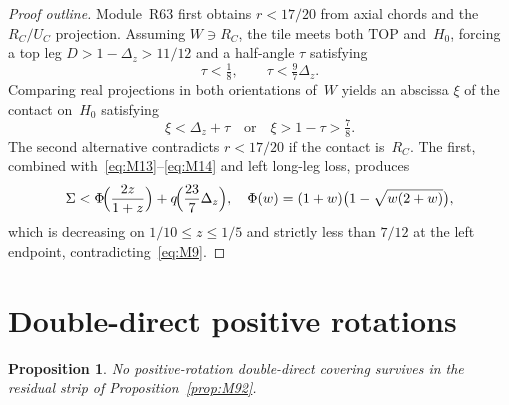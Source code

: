 \documentclass[11pt,reqno]{amsart}
\newtheorem{proposition}[theorem]{Proposition}
\theoremstyle{definition}
\newcommand{\TOP}{\mathrm{TOP}}
\begin{document}
\begin{proof}[Proof outline]
Module~R63 first obtains $r<17/20$ from axial chords and the $R_C/U_C$
projection.  Assuming $W\ni R_C$, the tile meets both $\TOP$ and~$H_0$, forcing a
top leg $D>1-\Delta_z>11/12$ and a half-angle $\tau$ satisfying
\begin{equation}\label{eq:M14}
\tau<\tfrac18,\qquad \tau<\tfrac97\Delta_z.
\end{equation}
Comparing real projections in both orientations of~$W$ yields an abscissa
$\xi$ of the contact on~$H_0$ satisfying
\begin{equation}\label{eq:M15}
\xi<\Delta_z+\tau
\quad\text{or}\quad
\xi>1-\tau>\tfrac78.
\end{equation}
The second alternative contradicts $r<17/20$ if the contact is~$R_C$.  The first,
combined with~\eqref{eq:M13}--\eqref{eq:M14} and left long-leg loss, produces
\begin{equation}
\Sigma<\Phi\!\Bigl(\frac{2z}{1+z}\Bigr)+q\!\Bigl(\frac{23}{7}\Delta_z\Bigr),
\quad
\Phi(w)=(1+w)\bigl(1-\sqrt{w(2+w)}\bigr),
\end{equation}
which is decreasing on $1/10\le z\le 1/5$ and strictly less than $7/12$ at the
left endpoint, contradicting~\eqref{eq:M9}.
\end{proof}

\section{Double-direct positive rotations}\label{sec:finale}

\begin{proposition}\label{prop:M111}
No positive-rotation double-direct covering survives in the residual strip of
Proposition~\ref{prop:M92}.
\end{proposition}
\end{document}
